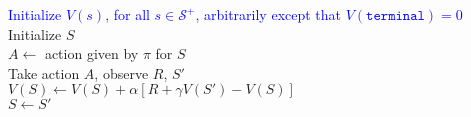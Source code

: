 \documentclass{standalone}
\begin{document}
\pagestyle{empty}
\begin{algorithm}[H]
  \KwInput{The policy $\pi$ to be evaluated; step size $\alpha \in (0, 1]$}
  \textcolor{blue}{Initialize $V(s)$, for all $s \in \mathcal S^+$, arbitrarily except that   $V(\texttt{terminal}) = 0$}\\
\textcolor{red} {
  Initialize $S$ \\
   {
    $A \gets $ action given by $\pi$ for $S$ \\
    Take action $A$, observe $R$, $S'$ \\
    $V(S) \gets V(S) + \alpha \left[ R + \gamma V(S') - V(S) \right]$ \\
    $S \gets S'$
  }
}
\end{algorithm}
\end{document}
